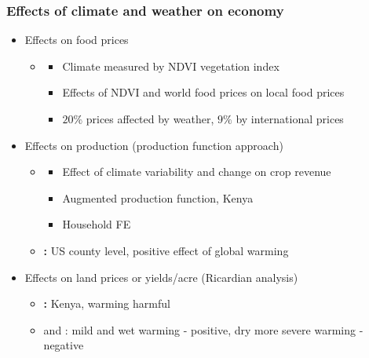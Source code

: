 \documentclass{beamer}              %
\begin{document}
\begin{frame}

\frametitle{Effects of climate and weather on economy}\label{EffectsCLimate} 


\begin{itemize}

\item Effects on food prices

\begin{itemize}

\item \textbf{\cite{Brown2015}}
\begin{itemize}
\item  Climate measured by NDVI vegetation index 
\item  Effects of NDVI and world food prices on local food prices
\item $20\%$ prices affected by weather, $9\%$ by international prices
\end{itemize}

\end{itemize}


\item Effects on production (production function approach)
\begin{itemize}
\item \textbf{\cite{Ochieng2016}}
\begin{itemize}
\item Effect of climate variability and change on crop revenue
\item Augmented production function, Kenya
\item  Household FE
\end{itemize}
\item \textbf{\cite{Deschenes2007Ric}:} US county level, positive effect of global warming
\end{itemize}
\item Effects on land prices or yields/acre (Ricardian analysis)
\begin{itemize}
\item  \textbf{\citet{kabubo2007}:} Kenya, warming harmful

\item  \cite{SeoMendelsohn} and \cite{KMendelsohn2008}: mild and wet warming - positive, dry more severe warming - negative


\end{itemize}

\end{itemize}
\end{frame}
\end{document}

